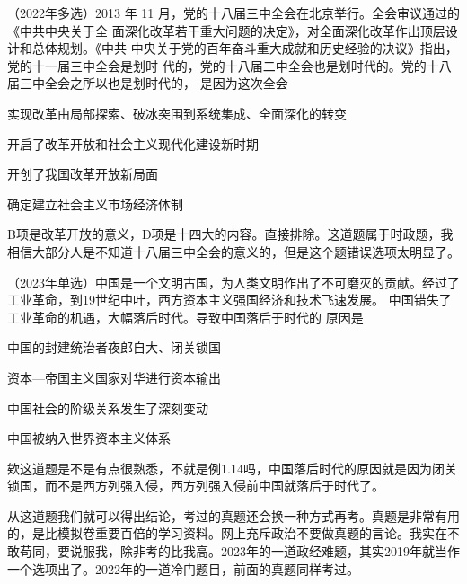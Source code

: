 \documentclass[lang=cn,blue,10pt,scheme=chinese,twocol]{zznote}
\begin{document}
\begin{example} （2022年多选）2013 年 11 月，党的十八届三中全会在北京举行。全会审议通过的《中共中央关于全
	面深化改革若干重大问题的决定》，对全面深化改革作出顶层设计和总体规划。《中共
	中央关于党的百年奋斗重大成就和历史经验的决议》指出，党的十一届三中全会是划时
	代的，党的十八届二中全会也是划时代的。党的十八届三中全会之所以也是划时代的，
	是因为这次全会
	\begin{choice}
		\item 实现改革由局部探索、破冰突围到系统集成、全面深化的转变
		\item 开启了改革开放和社会主义现代化建设新时期
		\item 开创了我国改革开放新局面
		\item 确定建立社会主义市场经济体制
	\end{choice}
\end{example}
\begin{solution}
	B项是改革开放的意义，D项是十四大的内容。直接排除。这道题属于时政题，我相信大部分人是不知道十八届三中全会的意义的，但是这个题错误选项太明显了。
\end{solution}
\begin{example}	（2023年单选）中国是一个文明古国，为人类文明作出了不可磨灭的贡献。经过了 工业革命，到19世纪中叶，西方资本主义强国经济和技术飞速发展。 中国错失了工业革命的机遇，大幅落后时代。导致中国落后于时代的
	原因是

	\begin{choice}
		\item 中国的封建统治者夜郎自大、闭关锁国
		\item 资本—帝国主义国家对华进行资本输出
		\item 中国社会的阶级关系发生了深刻变动
		\item 中国被纳入世界资本主义体系
	\end{choice}
\end{example}
\begin{solution}
	欸这道题是不是有点很熟悉，不就是例1.14吗，中国落后时代的原因就是因为闭关锁国，而不是西方列强入侵，西方列强入侵前中国就落后于时代了。
\end{solution}
\begin{postulate}
	从这道题我们就可以得出结论，考过的真题还会换一种方式再考。真题是非常有用的，是比模拟卷重要百倍的学习资料。网上充斥政治不要做真题的言论。我实在不敢苟同，要说服我，除非考的比我高。2023年的一道政经难题，其实2019年就当作一个选项出了。2022年的一道冷门题目，前面的真题同样考过。
\end{postulate}
\end{document}
